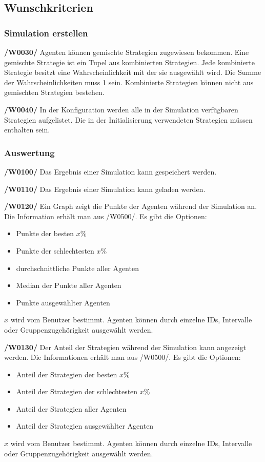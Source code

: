 \subsection{Wunschkriterien}

\subsubsection{Simulation erstellen}

\textbf{/W0030/}
Agenten können gemischte Strategien zugewiesen bekommen. {\color{red} Eine gemischte Strategie ist ein Tupel  aus kombinierten Strategien. Jede kombinierte Strategie besitzt eine Wahrscheinlichkeit mit der sie ausgewählt wird. Die Summe der Wahrscheinlichkeiten muss 1 sein. Kombinierte Strategien können nicht aus gemischten Strategien bestehen.}

\textbf{/W0040/}
In der Konfiguration werden alle in der Simulation verfügbaren Strategien aufgelistet. Die in der Initialisierung verwendeten Strategien müssen enthalten sein.

\subsubsection{Auswertung}

\textbf{/W0100/}
Das Ergebnis einer Simulation kann gespeichert werden.

\textbf{/W0110/}
Das Ergebnis einer Simulation kann geladen werden.

\textbf{/W0120/}
Ein Graph zeigt die Punkte der Agenten während der Simulation an. Die Information erhält man aus /W0500/. Es gibt die Optionen:
\begin{itemize}
\item Punkte der besten $x\%$
\item Punkte der schlechtesten $x\%$
\item durchschnittliche Punkte aller Agenten
\item Median der Punkte aller Agenten
\item Punkte ausgewählter Agenten
\end{itemize}
$x$ wird vom Benutzer bestimmt. Agenten können durch einzelne IDs, Intervalle oder Gruppenzugehörigkeit ausgewählt werden. 

\textbf{/W0130/}
Der Anteil der Strategien während der Simulation kann angezeigt werden. Die Informationen erhält man aus /W0500/. Es gibt die Optionen:
\begin{itemize}
\item Anteil der Strategien der besten $x\%$
\item Anteil der Strategien der schlechtesten $x\%$
\item Anteil der Strategien aller Agenten
\item Anteil der Strategien ausgewählter Agenten
\end{itemize}
$x$ wird vom Benutzer bestimmt. Agenten können durch einzelne IDs, Intervalle  oder Gruppenzugehörigkeit ausgewählt werden. 

